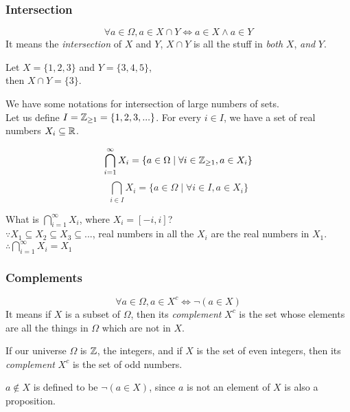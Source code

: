 \documentclass[a4paper]{article}
\begin{document}
\subsubsection{Intersection}
\begin{defi}[Intersection]
\[
	\forall a \in \Omega, a \in X \cap Y \iff a \in X \land a \in Y
\]
It means the \emph{intersection} of $X$ and $Y$, $X \cap Y$ is all the stuff in \emph{both} $X$, \emph{and} $Y$.
\end{defi}
\begin{eg}
Let $X = \{ 1, 2, 3 \}$ and $Y= \{ 3, 4, 5 \}$,\\
then $X \cap Y = \{ 3 \}$.
\end{eg}
We have some notations for intersection of large numbers of sets.\\
Let us define $I = \mathbb{Z}_{\geq1} = \{1,2,3,...\}$. For every $i \in I$, we have a set of real numbers $X_i \subseteq \mathbb{R}$.
\begin{notation}
$$\bigcap^\infty_{i=1} X_i = \{a \in \Omega \mid \forall i \in \mathbb{Z}_{\geq1}, a \in X_i\}$$
$$\bigcap_{i \in I} X_i = \{a \in \Omega \mid \forall i \in I, a \in X_i\}$$
\end{notation}

\begin{eg}
What is $\bigcap_{i=1}^\infty X_i$, where $X_i = [-i, i]$?\\
$\because X_1 \subseteq X_2 \subseteq X_3 \subseteq ...$, real numbers in all the $X_i$ are the real numbers in $X_1$.\\
$\therefore \bigcap_{i=1}^\infty X_i = X_1$
\end{eg}


\subsubsection{Complements}
\begin{defi}[Complements]
\[
	\forall a \in \Omega, a \in X^c \iff \lnot(a \in X)
\]
It means if $X$ is a subset of $\Omega$, then its \emph{complement} $X^c$ is the set whose elements are all the things in $\Omega$ which are not in $X$.
\end{defi}
\begin{eg}
If our universe $\Omega$ is $\mathbb{Z}$, the integers, and if $X$ is the set of even integers, then its \emph{complement} $X^c$ is the set of odd numbers.
\end{eg}
\begin{notation}
$a \notin X$ is defined to be $\lnot(a \in X)$, since $a$ is not an element of $X$ is also a proposition.
\end{notation}
\end{document}

